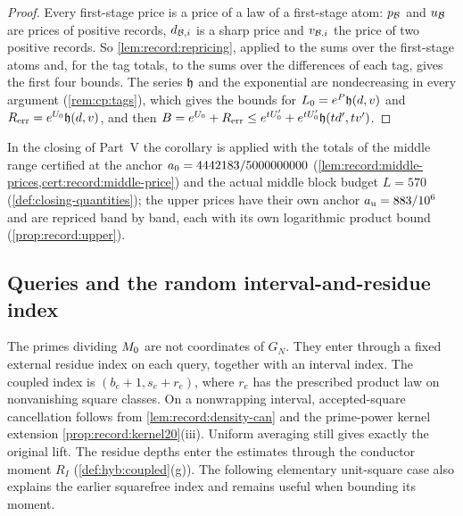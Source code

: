 \begin{proof}
Every first-stage price is a price of a law of a first-stage atom: $p_\mathcal B$
and $u_\mathcal B$ are prices of positive records, $d_{\mathcal B,i}$ is a sharp price and
$v_{\mathcal B,i}$ the price of two positive records. So
\cref{lem:record:repricing}, applied to the sums over the first-stage atoms
and, for the tag totals, to the sums over the differences of each tag, gives
the first four bounds. The series $\mathfrak h$ and the exponential are
nondecreasing in every argument (\cref{rem:cp:tags}), which gives the bounds
for $L_0=e^P\mathfrak h(d,v)$ and $R_{\rm err}=e^{U_0}\mathfrak h(d,v)$, and then
$B=e^{U_0}+R_{\rm err}\le e^{tU_0'}+e^{tU_0'}\mathfrak h(td',tv')$.
\end{proof}

In the closing of Part~V the corollary is applied with the totals of the
middle range certified at the anchor $a_0=4442183/5000000000$
(\cref{lem:record:middle-prices,cert:record:middle-price}) and the actual
middle block budget $L=570$ (\cref{def:closing-quantities}); the upper prices
have their own anchor $a_{\rm u}=883/10^6$ and are repriced band by band, each
with its own logarithmic product bound (\cref{prop:record:upper}).

\subsection{Queries and the random interval-and-residue index}\label{subsec:cp:index}

The primes dividing $M_0$ are not coordinates of $G_N$. They enter
through a fixed external residue index on each query, together with an
interval index.
The coupled index is $(b_e+1,s_e+r_e)$, where $r_e$ has the prescribed
product law on nonvanishing square classes. On a nonwrapping interval,
accepted-square cancellation follows from \cref{lem:record:density-can}
and the prime-power kernel extension \cref{prop:record:kernel20}(iii).
Uniform averaging still gives exactly the original lift. The residue depths
enter the estimates through the conductor moment $R_I$
(\cref{def:hyb:coupled}(g)).
The following elementary unit-square case also explains the earlier
squarefree index and remains useful when bounding its moment.

